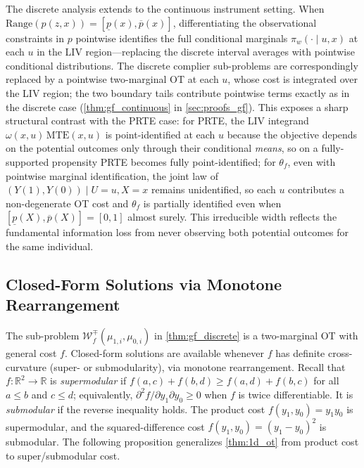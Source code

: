 \begin{remark}\label{rmk:gf_continuous}
    The discrete analysis extends to the continuous instrument setting. When $\mathrm{Range}(p(z, x)) = [\underline{p}(x), \overline{p}(x)]$, differentiating the observational constraints in $p$ pointwise identifies the full conditional marginals $\pi_w(\cdot \mid u, x)$ at each $u$ in the LIV region---replacing the discrete interval averages with pointwise conditional distributions. The discrete complier sub-problems are correspondingly replaced by a pointwise two-marginal OT at each $u$, whose cost is integrated over the LIV region; the two boundary tails contribute pointwise terms exactly as in the discrete case (\cref{thm:gf_continuous} in \cref{sec:proofs_gf}). This exposes a sharp structural contrast with the PRTE case: for PRTE, the LIV integrand $\omega(x, u)\,\mathrm{MTE}(x, u)$ is point-identified at each $u$ because the objective depends on the potential outcomes only through their conditional \emph{means}, so on a fully-supported propensity PRTE becomes fully point-identified; for $\theta_f$, even with pointwise marginal identification, the joint law of $(Y(1), Y(0)) \mid U = u, X = x$ remains unidentified, so each $u$ contributes a non-degenerate OT cost and $\theta_f$ is partially identified even when $[\underline{p}(X), \overline{p}(X)] = [0, 1]$ almost surely. This irreducible width reflects the fundamental information loss from never observing both potential outcomes for the same individual.
\end{remark}

\subsection{Closed-Form Solutions via Monotone Rearrangement}\label{subsec:gf_closedform}

The sub-problem $\mathcal{W}_f^\mp(\mu_{1,i}, \mu_{0,i})$ in \cref{thm:gf_discrete} is a two-marginal OT with general cost $f$. Closed-form solutions are available whenever $f$ has definite cross-curvature (super- or submodularity), via monotone rearrangement. Recall that $f : \mathbb{R}^2 \to \mathbb{R}$ is \emph{supermodular} if $f(a, c) + f(b, d) \geqslant f(a, d) + f(b, c)$ for all $a \leqslant b$ and $c \leqslant d$; equivalently, $\partial^2 f / \partial y_1 \partial y_0 \geqslant 0$ when $f$ is twice differentiable. It is \emph{submodular} if the reverse inequality holds. The product cost $f(y_1, y_0) = y_1 y_0$ is supermodular, and the squared-difference cost $f(y_1, y_0) = (y_1 - y_0)^2$ is submodular. The following proposition generalizes \cref{thm:1d_ot} from product cost to super/submodular cost.

